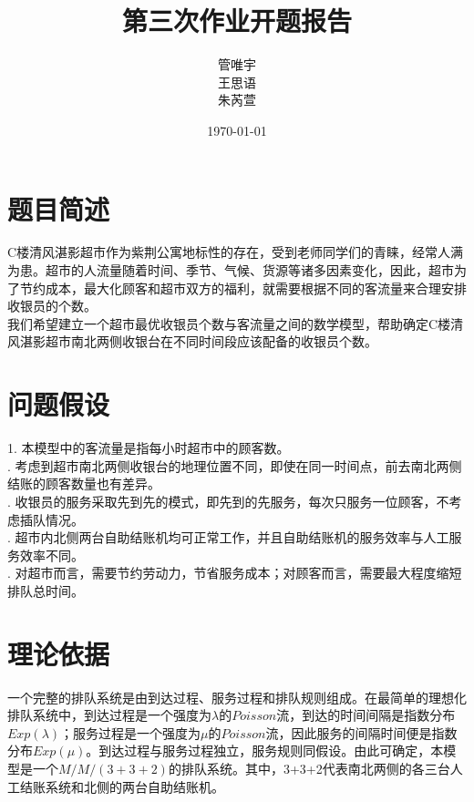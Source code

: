 \documentclass{article}
\title{第三次作业开题报告}
\author{{管唯宇 \quad 2015011547}\\{王思语 \quad 2015012054}\\{朱芮萱 \quad 2015012035}}
\date{\today}
\begin{document}
    \maketitle
    \fontsize{12pt}{17pt}\selectfont

    \section{题目简述}
    C楼清风湛影超市作为紫荆公寓地标性的存在，受到老师同学们的青睐，经常人满为患。超市的人流量随着时间、季节、气候、货源等诸多因素变化，因此，超市为了节约成本，最大化顾客和超市双方的福利，就需要根据不同的客流量来合理安排收银员的个数。\\
    \indent 我们希望建立一个超市最优收银员个数与客流量之间的数学模型，帮助确定C楼清风湛影超市南北两侧收银台在不同时间段应该配备的收银员个数。

    \section{问题假设}
    1. 本模型中的客流量是指每小时超市中的顾客数。\\
    . 考虑到超市南北两侧收银台的地理位置不同，即使在同一时间点，前去南北两侧结账的顾客数量也有差异。\\
    . 收银员的服务采取先到先的模式，即先到的先服务，每次只服务一位顾客，不考虑插队情况。\\
    . 超市内北侧两台自助结账机均可正常工作，并且自助结账机的服务效率与人工服务效率不同。\\
    . 对超市而言，需要节约劳动力，节省服务成本；对顾客而言，需要最大程度缩短排队总时间。
    \section{理论依据}
    一个完整的排队系统是由到达过程、服务过程和排队规则组成。在最简单的理想化排队系统中，到达过程是一个强度为$\lambda$的$Poisson$流，到达的时间间隔是指数分布$Exp(\lambda)$；服务过程是一个强度为$\mu$的$Poisson$流，因此服务的间隔时间便是指数分布$Exp(\mu)$。到达过程与服务过程独立，服务规则同假设。由此可确定，本模型是一个$M/M/(3+3+2)$的排队系统。其中，3+3+2代表南北两侧的各三台人工结账系统和北侧的两台自助结账机。

    
    
\end{document}
